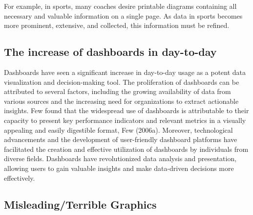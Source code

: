 \documentclass[print]{nuthesis}
\begin{document}

For example, in sports, many coaches desire printable diagrams containing all necessary and valuable information on a single page.
As data in sports becomes more prominent, extensive, and collected, this information must be refined.


\hypertarget{the-increase-of-dashboards-in-day-to-day}{%
\subsection{The increase of dashboards in day-to-day}\label{the-increase-of-dashboards-in-day-to-day}}

Dashboards have seen a significant increase in day-to-day usage as a potent data visualization and decision-making tool.
The proliferation of dashboards can be attributed to several factors, including the growing availability of data from various sources and the increasing need for organizations to extract actionable insights.
Few found that the widespread use of dashboards is attributable to their capacity to present key performance indicators and relevant metrics in a visually appealing and easily digestible format, Few (2006a).
Moreover, technological advancements and the development of user-friendly dashboard platforms have facilitated the creation and effective utilization of dashboards by individuals from diverse fields.
Dashboards have revolutionized data analysis and presentation, allowing users to gain valuable insights and make data-driven decisions more effectively.

\hypertarget{misleadingterrible-graphics}{%
\subsection{Misleading/Terrible Graphics}\label{misleadingterrible-graphics}}
\end{document}
